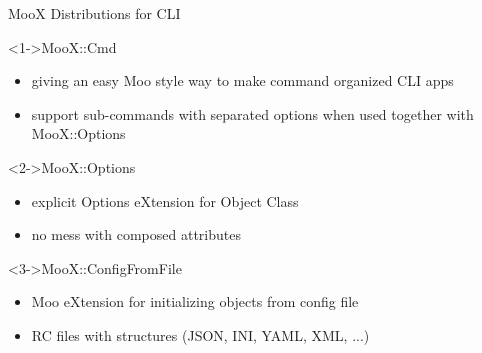 \documentclass[ngerman,xcolor={table,dvipsnames},smaller,compress,hyperref={bookmarks,colorlinks}]{beamer}
\begin{document}
\begin{frame}[t,fragile]{MooX Distributions for CLI}

\begin{block}<1->{MooX::Cmd}
\begin{itemize}
\item giving an easy Moo style way to make command organized CLI apps
\item support sub-commands with separated options when used together with MooX::Options
\end{itemize}
\end{block}

\begin{block}<2->{MooX::Options}
\begin{itemize}
\item explicit Options eXtension for Object Class
\item no mess with composed attributes
\end{itemize}
\end{block}

\begin{block}<3->{MooX::ConfigFromFile}
\begin{itemize}
\item Moo eXtension for initializing objects from config file
\item RC files with structures (JSON, INI, YAML, XML, ...)
\end{itemize}
\end{block}

\end{frame}
\end{document}
